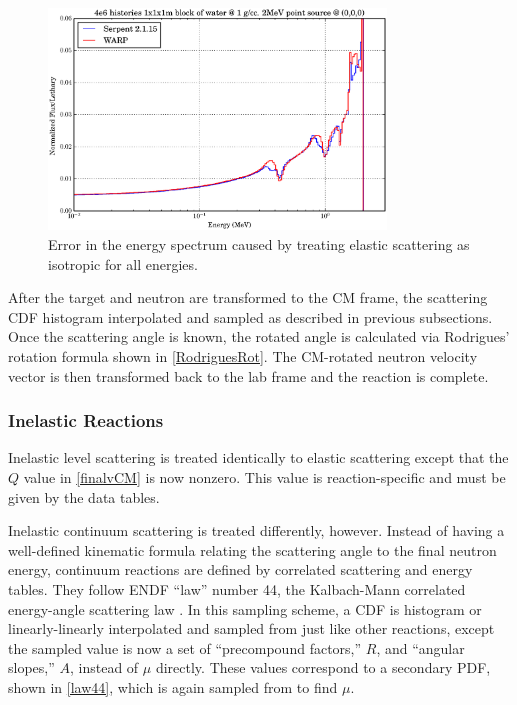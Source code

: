 \begin{figure}[h!] 
  \centering
    \includegraphics[width=0.8\textwidth]{graphics/scattering_error.eps}
     \caption{Error in the energy spectrum caused by treating elastic scattering as isotropic for all energies.\label{scattering_error}}
\end{figure}

After the target and neutron are transformed to the CM frame, the scattering CDF histogram interpolated and sampled as described in previous subsections.  Once the scattering angle is known, the rotated angle is calculated via Rodrigues' rotation formula shown in \eqref{RodriguesRot}.  The CM-rotated neutron velocity vector is then transformed back to the lab frame and the reaction is complete.

\subsubsection{Inelastic Reactions}

Inelastic level scattering is treated identically to elastic scattering except that the $Q$ value in \eqref{finalvCM} is now nonzero.  This value is reaction-specific and must be given by the data tables.  

Inelastic continuum scattering is treated differently, however.  Instead of having a well-defined kinematic formula relating the scattering angle to the final neutron energy, continuum reactions are defined by correlated scattering and energy tables.  They follow ENDF ``law'' number 44, the Kalbach-Mann correlated energy-angle scattering law \cite{mcnp} \cite{openmc}.  In this sampling scheme, a CDF is histogram or linearly-linearly interpolated and sampled from just like other reactions, except the sampled value is now a set of ``precompound factors,'' $R$, and ``angular slopes,'' $A$, instead of $\mu$ directly.  These values correspond to a secondary PDF, shown in \eqref{law44}, which is again sampled from to find $\mu$.


